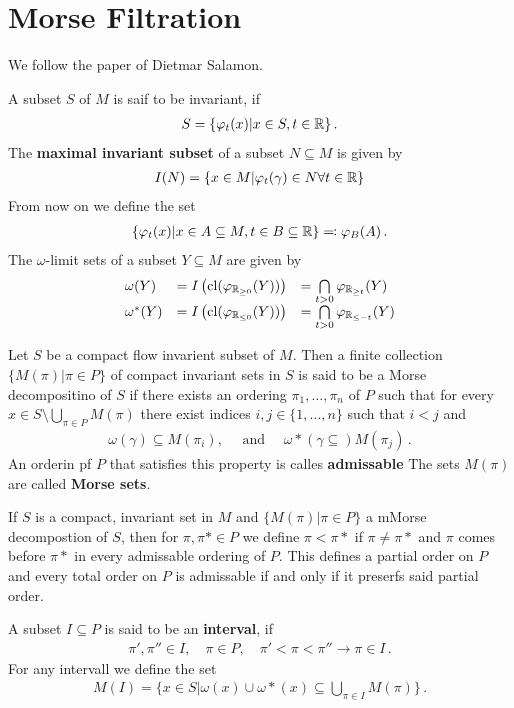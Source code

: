 \section{Morse Filtration}
We follow the paper of Dietmar Salamon.
\begin{definition}
	A subset $S$ of $M$ is saif to be invariant, if 
	\begin{align}
		S=\{\varphi_t(x)|x\in S, t\in \mathbb{R} \} \, .
	\end{align}
	The \textbf{maximal invariant subset} of a subset $N\subseteq M$ is given by 
	\begin{align}
		I(N)=\{ x \in M| \varphi _t(\gamma)\in N \forall t\in \mathbb{R} \}
	\end{align} From now on we define the set 
	\begin{align}
		\{\varphi_t(x)| x \in A\subseteq M,t\in B\subseteq \mathbb{R} \}\eqcolon \varphi_B(A)\, .
	\end{align}The $\omega$-limit sets of a subset $Y\subseteq M$ are given by
\[
\begin{array}{lll}
	\omega(Y) &= I\left(\operatorname{\mathrm{cl}}(\varphi_{\mathbb{R}_{\geq 0}}(Y))\right) & = \bigcap\limits_{t>0} \varphi_{\mathbb{R}_{\geq t}}(Y) \\
	\omega^*(Y) &= I\left(\operatorname{\mathrm{cl}}(\varphi_{\mathbb{R}_{\leq 0}}(Y))\right) & = \bigcap\limits_{t>0} \varphi_{\mathbb{R}_{\leq -t}}(Y)
\end{array}
\]
\end{definition}
\begin{definition}
Let $S$ be a compact flow invarient subset of $M$. Then a finite collection $\{M(\pi)|\pi\in P\}$ of compact invariant sets in $S$ is said to be a Morse decompositino of $S$ if there exists an ordering $\pi_1,\dots,\pi_n$ of $P$ such that for every $ x \in S \setminus \bigcup_{\pi\in P}M(\pi)$ there exist indices $i,j\in \{1,\dots,n\}$ such that $i<j$ and 
\begin{align}
	\omega(\gamma) \subseteq M(\pi_i),\quad \text{ and } \quad\omega*(\gamma\subseteq) M(\pi_j) \, .
	\end{align} An orderin pf $P$ that satisfies this property is calles \textbf{admissable} The sets $M(\pi)$ are called \textbf{Morse sets}.
\end{definition}
\begin{cor}
	If $S$ is a compact, invariant set in $M$ and $\{M(\pi)|\pi\in P\}$ a mMorse decompostion of $S$, then for $\pi,\pi*\in P$ we define $\pi <\pi*$ if $\pi \neq \pi*$ and $\pi$ comes before $\pi*$ in every admissable ordering of $P$. This defines a partial order on $P$ and every total order on $P$ is admissable if and only if it preserfs said partial order. 
\end{cor}
\begin{definition}
	A subset $I\subseteq P$ is said to be an \textbf{interval}, if 
	\begin{align*}
		\pi',\pi''\in I,\quad \pi \in P,\quad \pi'<\pi<\pi''  \rightarrow \pi\in I \, .
	\end{align*} For any intervall we define the set 
	\begin{align*}
		M(I)=\{ x \in S | \omega (x)\cup \omega*(x)\subseteq \bigcup\limits_{\pi \in I}M(\pi)\}\, .
	\end{align*}
\end{definition}